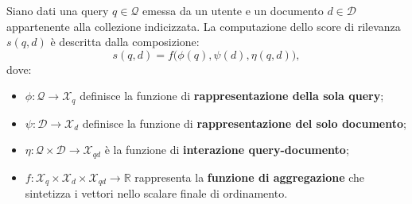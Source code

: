 \begin{definition}
Siano dati una query $q \in \mathcal{Q}$ emessa da un utente e un documento $d \in \mathcal{D}$ appartenente alla collezione indicizzata. La computazione dello score di rilevanza $s(q, d)$ \`e descritta dalla composizione:
\begin{equation}
    s(q, d) = f\big(\phi(q), \psi(d), \eta(q, d)\big),
    \label{eq:general-ranking-framework}
\end{equation}
dove:
\begin{itemize}
    \item $\phi: \mathcal{Q} \to \mathcal{X}_q$ definisce la funzione di \textbf{rappresentazione della sola query};
    \item $\psi: \mathcal{D} \to \mathcal{X}_d$ definisce la funzione di \textbf{rappresentazione del solo documento};
    \item $\eta: \mathcal{Q} \times \mathcal{D} \to \mathcal{X}_{qd}$ \`e la funzione di \textbf{interazione query-documento};
    \item $f: \mathcal{X}_q \times \mathcal{X}_d \times \mathcal{X}_{qd} \to \mathbb{R}$ rappresenta la \textbf{funzione di aggregazione} che sintetizza i vettori nello scalare finale di ordinamento.
\end{itemize}
\end{definition}

